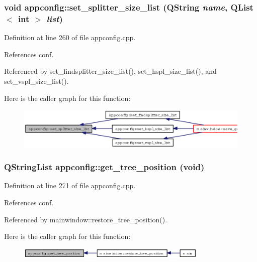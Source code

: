 \subsubsection{\setlength{\rightskip}{0pt plus 5cm}void appconfig::set\_\-splitter\_\-size\_\-list (QString {\em name}, QList$<$ int $>$ {\em list})}\label{classappconfig_9034c4651468dc4fc51f85e790aae53e}




Definition at line 260 of file appconfig.cpp.

References conf.

Referenced by set\_\-findsplitter\_\-size\_\-list(), set\_\-hspl\_\-size\_\-list(), and set\_\-vspl\_\-size\_\-list().

Here is the caller graph for this function:\begin{figure}[H]
\begin{center}
\leavevmode
\includegraphics[width=324pt]{classappconfig_9034c4651468dc4fc51f85e790aae53e_icgraph}
\end{center}
\end{figure}
\subsubsection{\setlength{\rightskip}{0pt plus 5cm}QString\-List appconfig::get\_\-tree\_\-position (void)}\label{classappconfig_5b1150362b24baa90af6fed0df881289}




Definition at line 271 of file appconfig.cpp.

References conf.

Referenced by mainwindow::restore\_\-tree\_\-position().

Here is the caller graph for this function:\begin{figure}[H]
\begin{center}
\leavevmode
\includegraphics[width=257pt]{classappconfig_5b1150362b24baa90af6fed0df881289_icgraph}
\end{center}
\end{figure}
